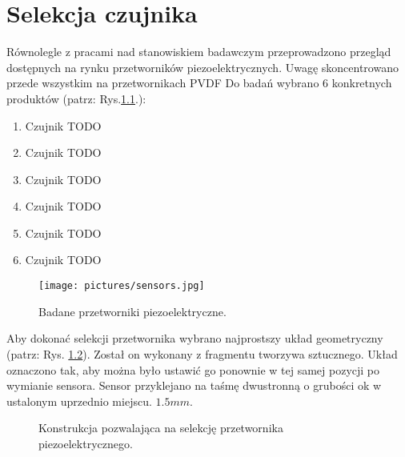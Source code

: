 \chapter{Selekcja czujnika}
\label{sec:sensor_selection}
Równolegle z pracami nad stanowiskiem badawczym przeprowadzono przegląd dostępnych na rynku przetworników piezoelektrycznych. Uwagę skoncentrowano przede wszystkim na przetwornikach PVDF\cite{PVDF:15}
Do badań wybrano 6 konkretnych produktów (patrz: Rys.\ref{fig:sensors}.):

\begin{enumerate}
\item Czujnik TODO
\item Czujnik TODO
\item Czujnik TODO
\item Czujnik TODO
\item Czujnik TODO
\item Czujnik TODO
\end{enumerate}


\begin{figure}[htbp]
\centering
\texttt{[image: pictures/sensors.jpg]}
\caption{Badane przetworniki piezoelektryczne.}
\label{fig:sensors}
\end{figure}

Aby dokonać selekcji przetwornika wybrano najprostszy układ geometryczny (patrz: Rys. \ref{fig:sensor_sel_geometry}). Został on wykonany z fragmentu tworzywa sztucznego. Układ oznaczono tak, aby można było ustawić go ponownie w tej samej pozycji po wymianie sensora. Sensor przyklejano na taśmę dwustronną o grubości ok w ustalonym uprzednio miejscu. $1.5mm$. 

\begin{figure}[htbp]
\centering
{}%
\caption{Konstrukcja pozwalająca na selekcję przetwornika piezoelektrycznego.}
\label{fig:sensor_sel_geometry}
\end{figure}


